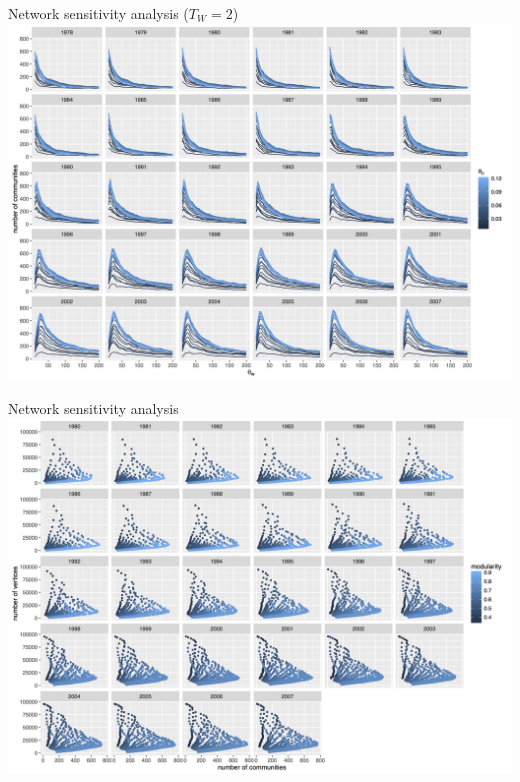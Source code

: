 \documentclass{beamer}
\begin{document}
\begin{frame}{Network sensitivity analysis ($T_W = 2$)}
	\includegraphics[width=\textwidth]{figures/commnum_thetaw_byyears_window3.png}
\end{frame}


\begin{frame}{Network sensitivity analysis}
	\includegraphics[width=\textwidth]{figures/vcount_comnum_pareto.png}
\end{frame}
\end{document}
